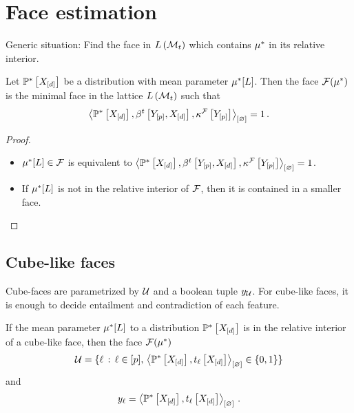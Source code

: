 \section{Face estimation}

Generic situation:
Find the face in $L\left(\mathcal{M}_{t}\right)$ which contains $\mu^*$ in its relative interior.

\begin{theorem}
    Let $\mathbb{P}^*\left[X_{[d]}\right]$ be a distribution with mean parameter $\mu^*[L]$.
    Then the face $\mathcal{F}(\mu^*)$ is the minimal face in the lattice $L\left(\mathcal{M}_{t}\right)$ such that
    \begin{align*}
        \left\langle \mathbb{P}^*\left[X_{[d]}\right],\beta^{t}\left[Y_{[p]},X_{[d]}\right],\kappa^{\mathcal{F}}\left[Y_{[p]}\right]\right\rangle_{\left[ \varnothing \right]}
        = 1 \, .
    \end{align*}
\end{theorem}
\begin{proof}
    \begin{itemize}
        \item $\mu^*[L]\in\mathcal{F}$ is equivalent to $\left\langle \mathbb{P}^*\left[X_{[d]}\right],\beta^{t}\left[Y_{[p]},X_{[d]}\right],\kappa^{\mathcal{F}}\left[Y_{[p]}\right]\right\rangle_{\left[ \varnothing \right]}=1$.
        \item If $\mu^*[L]$ is not in the relative interior of $\mathcal{F}$, then it is contained in a smaller face.
    \end{itemize}
\end{proof}

\subsection{Cube-like faces}

Cube-faces are parametrized by $\mathcal{U}$ and a boolean tuple $y_{\mathcal{U}}$.
For cube-like faces, it is enough to decide entailment and contradiction of each feature.

\begin{theorem}
    If the mean parameter $\mu^*[L]$ to a distribution $\mathbb{P}^*\left[X_{[d]}\right]$ is in the relative interior of a cube-like face, then the face $\mathcal{F}(\mu^*)$
    \begin{align*}
        \mathcal{U}
        =\{\ell \,:\, \ell\in[p] ,\, \left\langle \mathbb{P}^*\left[X_{[d]}\right],t_{\ell}\left[X_{[d]}\right]\right\rangle_{\left[ \varnothing \right]} \in \{0,1\} \}
    \end{align*}
    and
    \begin{align*}
        y_{\ell}
        = \left\langle \mathbb{P}^*\left[X_{[d]}\right],t_{\ell}\left[X_{[d]}\right]\right\rangle_{\left[ \varnothing \right]} \, .
    \end{align*}
\end{theorem}

